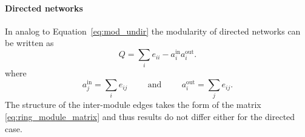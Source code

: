 \paragraph{Directed networks\color{Cayenne}{.}}
In analog to Equation~\eqref{eq:mod_undir} the modularity of directed networks can be written as \citep{Kao:2007}
\begin{equation}\label{eq:mod_directed}
Q=\sum _i e_{ii} - a_i ^{\text{in}} a_i ^{\text{out}}.
\end{equation}
where
\[
a_j ^\text{in}= \sum _i e_{ij} \hspace{1cm} \text{and} \hspace{1cm} a_i ^\text{out}= \sum _j e_{ij}.
\]
The structure of the inter-module edges takes the form of the matrix \eqref{eq:ring_module_matrix} and thus results do not differ either for the directed case.






%
%
%
%
%
